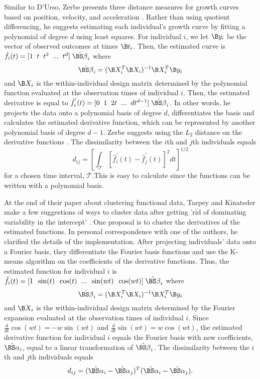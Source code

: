 Similar to D'Urso, Zerbe presents three distance measures for growth curves based on position, velocity, and acceleration \cite{zerbe1979,schneiderman1993}. Rather than using quotient differencing, he suggests estimating each individual's growth curve by fitting a polynomial of degree $d$ using least squares. For individual $i$, we let $\B y_{i}$ be the vector of observed outcomes at times $\B t_{i}$. Then, the estimated curve is $\hat{f}_{i}(t) = [1\;\; t\;\;t^{2}\;\;...\;\;t^{d}]\;\hat{\BS\beta}_{i}$ where 
$$\hat{\BS\beta}_{i} = (\B X^{T}_{i}\B X_{i})^{-1}\B X^{T}_{i}\B y_{i}$$
and $\B X_{i}$ is the within-individual design matrix determined by the polynomial function evaluated at the observation times of individual $i$. Then, the estimated derivative is equal to
$\hat{f}_{i}^{'}(t) = [0\;\; 1\;\;2t\;\;...\;\;dt^{d-1}]\;\hat{\BS\beta}_{i}$. In other words, he projects the data onto a polynomial basis of degree $d$, differentiates the basis and calculates the estimated derivative function, which can be represented by another polynomial basis of degree $d-1$. Zerbe suggests using the $L_{2}$ distance on the derivative functions \cite{schneiderman1993}. The dissimilarity between the $i$th and $j$th individuals equals
$$d_{ij} =\left[ \int_{\mathcal{T}} [\hat{f}^{'}_{i}(t)-\hat{f}^{'}_{j}(t)]^{2}dt\right]^{1/2}$$
for a chosen time interval, $\mathcal{T}$.This is easy to calculate since the functions can be written with a polynomial basis.

At the end of their paper about clustering functional data, Tarpey and Kinateder make a few suggestions of ways to cluster data after getting 'rid of dominating variability in the intercept' \cite{tarpey2003}. One proposal is to cluster the derivatives of the estimated functions. In personal correspondence with one of the authors, he clarified the details of the implementation. After projecting individuals' data onto a Fourier basis, they differentiate the Fourier basis functions and use the K-means algorithm on the coefficients of the derivative functions. Thus, the estimated function for individual $i$ is $\hat{f}_{i}(t)= [1\;\; \sin(t)\;\;\cos(t)\;\;...\;\;\sin(wt)\;\;\cos(wt)]\;\hat{\BS\beta}_{i}$ where
$$\hat{\BS\beta}_{i} = (\B X^{T}_{i}\B X_{i})^{-1}\B X^{T}_{i}\B y_{i}$$
and $\B X_{i}$ is the within-individual design matrix determined by the Fourier expansion evaluated at the observation times of individual $i$. Since $\frac{d}{dt}\cos(wt) = -w\sin(wt)$ and $\frac{d}{dt}\sin(wt) = w\cos(wt)$, the estimated derivative function for individual $i$ equals the Fourier basis with new coefficients, $\hat{\BS\alpha}_{i}$, equal to a linear transformation of $\hat{\BS\beta}_{i}$. The dissimilarity between the $i$th and $j$th individuals equals
$$d_{ij} = (\hat{\BS\alpha}_{i}-\hat{\BS\alpha}_{j})^{T}(\hat{\BS\alpha}_{i}-\hat{\BS\alpha}_{j}).$$

